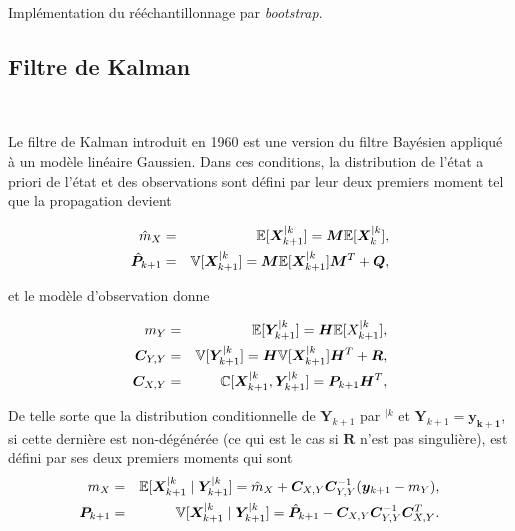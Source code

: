 \begin{algorithm}
    \caption{Implémentation du rééchantillonnage par \textit{bootstrap}.}
    \For{membre $n$ do}{
    Tirer $u$ dans $\mathcal{U}[0,1[$\;
    Initialiser $j=1$\;
    Affecter $S_w = w^1$\;
    \While{$S_w < u$}{
        $j = j+1$\;
        $S_w = S_w + w(j)\;$
    }
    Le membre $j$  est conservé et remplace le membre $n$.
    }
\end{algorithm}

\subsection{Filtre de Kalman}~\label{kalman_filter}

Le filtre de Kalman introduit en 1960 \cite{kalman_new_1960} est une version du filtre Bayésien appliqué à un modèle linéaire Gaussien. Dans ces conditions, la distribution de l'état a priori de l'état et des observations sont défini par leur deux premiers moment tel que la propagation devient

\begin{eqnarray*}
    \hat m_X &=& \mathbb{E} [\bm X_{k+1}^{\mid k}] = \bm M \mathbb{E} [\bm X_{k}^{\mid k}],\\
    \hat{\bm  P}_{k+1} &=& \mathbb{V} [\bm X_{k+1}^{\mid k}] = \bm M \mathbb{E} [\bm X_{k+1}^{\mid k}] \bm M^T + \bm Q,
\end{eqnarray*}

et le modèle d'observation donne

\begin{eqnarray*}
    m_Y &=& \mathbb{E} [\bm Y_{k+1}^{\mid k}] = \bm H \mathbb{E} [X_{k+1}^{\mid k}],\\
    \bm C_{Y,Y}&=&\mathbb{V} [\bm Y_{k+1}^{\mid k}] = \bm H \mathbb{V} [\bm X_{k+1}^{\mid k}] \bm H^T + \bm R, \\
    \bm C_{X,Y} &=& \mathbb{C}[\bm X_{k+1}^{\mid k},\bm Y^{\mid k}_{k+1}] = \bm P_{k+1} \bm H^T,
\end{eqnarray*}

De telle sorte que la distribution conditionnelle de $\bm Y_{k+1}$ par $^{\mid k}$ et $\bm Y_{k+1} = \bm{y_{k+1}}$, si cette dernière est non-dégénérée (ce qui est le cas si $\bm R$ n'est pas singulière), est défini par ses deux premiers moments qui sont
\begin{eqnarray*}
    m_X &=& \mathbb{E}[\bm X^{\mid k}_{k+1} \mid \bm Y_{k+1}^{\mid k}] = \hat m_X + \bm C_{X,Y} \bm C_{Y,Y}^{-1} (\bm y_{k+1} - m_Y), \\
    \bm P_{k+1} &=& \mathbb{V}[\bm X^{\mid k}_{k+1} \mid \bm Y_{k+1}^{\mid k}] = \hat{\bm  P}_{k+1} - \bm C_{X,Y} \bm C_{Y,Y}^{-1} \bm C_{X,Y}^T.
\end{eqnarray*}

